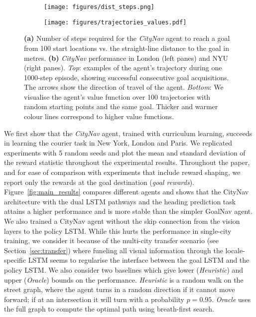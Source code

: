 \begin{figure}[b]
\begin{center}
\begin{subfigure}{.5\textwidth}
  \centering
  \texttt{[image: figures/dist\_steps.png]}
  \caption{}
  \label{fig:steps}
\end{subfigure}%
\begin{subfigure}{.5\textwidth}
  \centering
  \texttt{[image: figures/trajectories\_values.pdf]}
  \caption{}
  \label{fig:value_london_nyu}
\end{subfigure}
\caption{
\textbf{(a)} Number of steps required for the \emph{CityNav} agent to reach a goal from 100 start locations vs. the straight-line distance to the goal in metres. \textbf{(b)} \emph{CityNav} performance in London (left panes) and NYU (right panes). \emph{Top}: examples of the agent's trajectory during one 1000-step episode, showing successful consecutive goal acquisitions. The arrows show the direction of travel of the agent. \emph{Bottom}: We visualise the agent's value function over 100 trajectories with random starting points and the same goal. Thicker and warmer colour lines correspond to higher value functions.
}
\end{center}
\vskip -0.25in
\end{figure}

We first show that the \emph{CityNav} agent, trained with curriculum learning, succeeds in learning the courier task in New York, London and Paris. We replicated experiments with 5 random seeds and plot the mean and standard deviation of the reward statistic throughout the experimental results. Throughout the paper, and for ease of comparison with experiments that include reward shaping, we report only the rewards at the goal destination (\emph{goal rewards}). Figure~\ref{fig:main_results} compares different agents and shows that the CityNav architecture with the dual LSTM pathways and the heading prediction task attains a higher performance and is more stable than the simpler GoalNav agent. We also trained a CityNav agent without the skip connection from the vision layers to the policy LSTM. While this hurts the performance in single-city training, we consider it because of the multi-city transfer scenario (see Section~\ref{sec:transfer}) where funeling all visual information through the locale-specific LSTM seems to regularise the interface between the goal LSTM and the policy LSTM.
We also consider two baselines which give lower (\emph{Heuristic}) and upper (\emph{Oracle}) bounds on the performance.
\emph{Heuristic} is a random walk on the street graph, where the agent turns in a random direction if it cannot move forward; if at an intersection it will turn with a probability $p=0.95$.
\emph{Oracle} uses the full graph to compute the optimal path using breath-first search.

